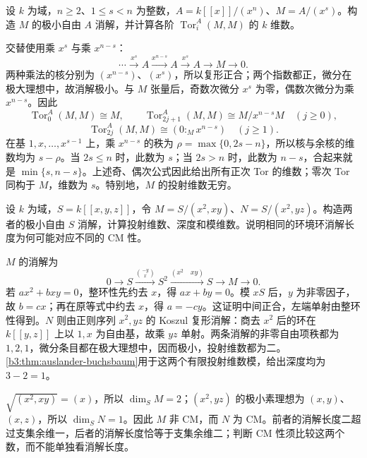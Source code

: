 \begin{exercise}\label{b3:ex:19-periodic-hypersurface}
	设 \(k\) 为域，\(n\ge2\)、\(1\le s<n\) 为整数，\(A=k[\![x]\!]/(x^n)\)、\(M=A/(x^s)\)。构造 \(M\) 的极小自由 \(A\) 消解，并计算各阶 \(\operatorname{Tor}_i^A(M,M)\) 的 \(k\) 维数。
\end{exercise}
\begin{solution}
	交替使用乘 \(x^s\) 与乘 \(x^{n-s}\)：
	\[
		\cdots\xrightarrow{x^s}A\xrightarrow{x^{n-s}}A \xrightarrow{x^s}A\longrightarrow M\longrightarrow0.
	\]
	两种乘法的核分别为 \((x^{n-s})\)、\((x^s)\)，所以复形正合；两个指数都正，微分在极大理想中，故消解极小。与 \(M\) 张量后，奇数次微分 \(x^s\) 为零，偶数次微分为乘 \(x^{n-s}\)。因此
	\[
		\operatorname{Tor}_0^A(M,M)\cong M,\qquad \operatorname{Tor}_{2j+1}^A(M,M)\cong M/x^{n-s}M\quad(j\ge0),
	\]
	\[
		\operatorname{Tor}_{2j}^A(M,M)\cong(0:_Mx^{n-s})\quad(j\ge1).
	\]
	在基 \(1,x,\ldots,x^{s-1}\) 上，乘 \(x^{n-s}\) 的秩为 \(\rho=\max\{0,2s-n\}\)，所以核与余核的维数均为 \(s-\rho\)。当 \(2s\le n\) 时，此数为 \(s\)；当 \(2s>n\) 时，此数为 \(n-s\)，合起来就是 \(\min\{s,n-s\}\)。上述奇、偶次公式因此给出所有正次 Tor 的维数；零次 Tor 同构于 \(M\)，维数为 \(s\)。特别地，\(M\) 的投射维数无穷。
\end{solution}

\begin{exercise}\label{b3:ex:19-pd-codimension}
	设 \(k\) 为域，\(S=k[\![x,y,z]\!]\)，令 \(M=S/(x^2,xy)\)、\(N=S/(x^2,yz)\)。构造两者的极小自由 \(S\) 消解，计算投射维数、深度和模维数。说明相同的环境环消解长度为何可能对应不同的 CM 性。
\end{exercise}
\begin{solution}
	\(M\) 的消解为
	\[
		0\longrightarrow S\xrightarrow{\binom{-y}{x}}S^2 \xrightarrow{(x^2\quad xy)}S\longrightarrow M\longrightarrow0.
	\]
	若 \(ax^2+bxy=0\)，整环性先约去 \(x\)，得 \(ax+by=0\)。模 \(xS\) 后，\(y\) 为非零因子，故 \(b=cx\)；再在原等式中约去 \(x\)，得 \(a=-cy\)。这证明中间正合，左端单射由整环性得到。\(N\) 则由正则序列 \(x^2,yz\) 的 Koszul 复形消解：商去 \(x^2\) 后的环在 \(k[\![y,z]\!]\) 上以 \(1,x\) 为自由基，故乘 \(yz\) 单射。两条消解的非零自由项秩都为 \(1,2,1\)，微分条目都在极大理想中，因而极小，投射维数都为二。\cref{b3:thm:auslander-buchsbaum}用于这两个有限投射维数模，给出深度均为 \(3-2=1\)。

	\(\sqrt{(x^2,xy)}=(x)\)，所以 \(\dim_SM=2\)；\((x^2,yz)\) 的极小素理想为 \((x,y)\)、\((x,z)\)，所以 \(\dim_SN=1\)。因此 \(M\) 非 CM，而 \(N\) 为 CM。前者的消解长度二超过支集余维一，后者的消解长度恰等于支集余维二；判断 CM 性须比较这两个数，而不能单独看消解长度。
\end{solution}

